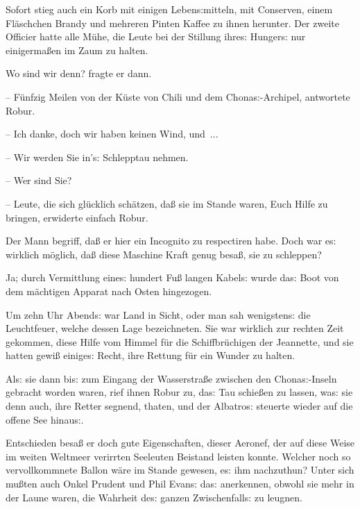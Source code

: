 \documentclass[oneside,12pt]{book}
\newcommand{\s}{s:}
\begin{document}
Sofort stieg auch ein Korb mit einigen Leben{\s}mitteln, mit
Conserven, einem Fl\"aschchen Brandy und mehreren Pinten Kaffee zu
ihnen herunter. Der zweite Officier hatte alle M\"uhe, die Leute bei
der Stillung ihre{\s} Hunger{\s} nur einigerma{\ss}en im Zaum zu
halten.

{\glqq}Wo sind wir denn? fragte er dann.

-- F\"unfzig Meilen von der K\"uste von Chili und dem
Chona{\s}-Archipel, antwortete Robur.

-- Ich danke, doch wir haben keinen Wind, und~...

-- Wir werden Sie in'{\s} Schlepptau nehmen.

-- Wer sind Sie?

-- Leute, die sich gl\"ucklich sch\"atzen, da{\ss} sie im Stande
waren, Euch Hilfe zu bringen,{\grqq} erwiderte einfach Robur.

Der Mann begriff, da{\ss} er hier ein Incognito zu respectiren habe.
Doch war e{\s} wirklich m\"oglich, da{\ss} diese Maschine Kraft genug
besa{\ss}, sie zu schleppen?

Ja; durch Vermittlung eine{\s} hundert Fu{\ss} langen Kabel{\s} wurde
da{\s} Boot von dem m\"achtigen Apparat nach Osten hingezogen.

Um zehn Uhr Abend{\s} war Land in Sicht, oder man sah wenigsten{\s}
die Leuchtfeuer, welche dessen Lage bezeichneten. Sie war wirklich
zur rechten Zeit gekommen, diese Hilfe vom Himmel f\"ur die
Schiffbr\"uchigen der {\glqq}Jeannette{\grqq}, und sie hatten
gewi{\ss} einige{\s} Recht, ihre Rettung f\"ur ein Wunder zu halten.

Al{\s} sie dann bi{\s} zum Eingang der Wasserstra{\ss}e zwischen den
Chona{\s}-Inseln gebracht worden waren, rief ihnen Robur zu, da{\s}
Tau schie{\ss}en zu lassen, wa{\s} sie denn auch, ihre Retter
segnend, thaten, und der {\glqq}Albatro{\s}{\grqq} steuerte wieder
auf die offene See hinau{\s}.

Entschieden besa{\ss} er doch gute Eigenschaften, dieser Aeronef, der
auf diese Weise im weiten Weltmeer verirrten Seeleuten Beistand
leisten konnte. Welcher noch so vervollkommnete Ballon w\"are im
Stande gewesen, e{\s} ihm nachzuthun? Unter sich mu{\ss}ten auch
Onkel Prudent und Phil Evan{\s} da{\s} anerkennen, obwohl sie mehr in
der Laune waren, die Wahrheit de{\s} ganzen Zwischenfall{\s} zu
leugnen.
\end{document}
